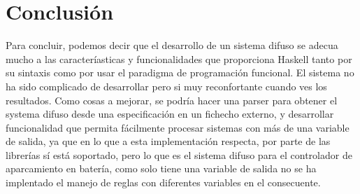 \section{Conclusión}
Para concluir, podemos decir que el desarrollo de un sistema difuso se
adecua mucho a las caracteríasticas y funcionalidades que proporciona
Haskell tanto por su sintaxis como por usar el paradigma de
programación funcional. El sistema no ha sido complicado de
desarrollar pero si muy reconfortante cuando ves los resultados. Como
cosas a mejorar, se podría hacer una parser para obtener el systema
difuso desde una especificación en un fichecho externo, y desarrollar
funcionalidad que permita fácilmente procesar sistemas con más de una
variable de salida, ya que en lo que a esta implementación respecta,
por parte de las librerías sí está soportado, pero lo que es el
sistema difuso para el controlador de aparcamiento en batería, como
solo tiene una variable de salida no se ha implentado el manejo de
reglas con diferentes variables en el consecuente.